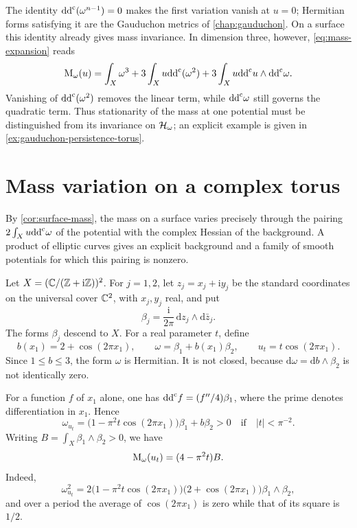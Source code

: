 The identity $\mathrm{dd}^{\mathrm{c}}(\omega^{n-1})=0$ makes the first variation vanish at $u=0$; Hermitian forms satisfying it are the Gauduchon metrics of \cref{chap:gauduchon}. On a surface this identity already gives mass invariance. In dimension three, however, \eqref{eq:mass-expansion} reads
\[
 \mathrm M_\omega(u)=\int_X\omega^3
 +3\int_Xu\mathrm{dd}^{\mathrm{c}}(\omega^2)
 +3\int_Xu\mathrm{dd}^{\mathrm{c}} u\wedge\mathrm{dd}^{\mathrm{c}}\omega.
\]
Vanishing of $\mathrm{dd}^{\mathrm{c}}(\omega^2)$ removes the linear term, while $\mathrm{dd}^{\mathrm{c}}\omega$ still governs the quadratic term. Thus stationarity of the mass at one potential must be distinguished from its invariance on $\mathcal H_\omega$; an explicit example is given in \cref{ex:gauduchon-persistence-torus}.

\section{Mass variation on a complex torus}

By \cref{cor:surface-mass}, the mass on a surface varies precisely through the pairing $2\int_Xu\mathrm{dd}^{\mathrm{c}}\omega$ of the potential with the complex Hessian of the background. A product of elliptic curves gives an explicit background and a family of smooth potentials for which this pairing is nonzero.

\begin{example}\label{ex:torus-mass}
Let $X=(\mathbb C/(\mathbb Z+\mathrm i\mathbb Z))^2$. For $j=1,2$, let $z_j=x_j+\mathrm i y_j$ be the standard coordinates on the universal cover $\mathbb C^2$, with $x_j,y_j$ real, and put
\[
 \beta_j=\frac{\mathrm i}{2\pi}\,\mathrm{d}z_j\wedge \mathrm{d}\bar z_j.
\]
The forms $\beta_j$ descend to $X$. For a real parameter $t$, define
\[
 b(x_1)=2+\cos(2\pi x_1),\qquad
 \omega=\beta_1+b(x_1)\beta_2,\qquad
 u_t=t\cos(2\pi x_1).
\]
Since $1\leq b\leq3$, the form $\omega$ is Hermitian. It is not closed, because $\mathrm{d}\omega=\mathrm{d}b\wedge\beta_2$ is not identically zero.

For a function $f$ of $x_1$ alone, one has $\mathrm{dd}^{\mathrm{c}} f=(f''/4)\beta_1$, where the prime denotes differentiation in $x_1$. Hence
\[
 \omega_{u_t}
 =\bigl(1-\pi^2t\cos(2\pi x_1)\bigr)\beta_1+b\beta_2>0
 \quad\text{if}\quad |t|<\pi^{-2}.
\]
Writing $B=\int_X\beta_1\wedge\beta_2>0$, we have
\begin{equation}\label{eq:torus-mass}
 \mathrm M_\omega(u_t)=(4-\pi^2t)B.
\end{equation}
Indeed,
\[
 \omega_{u_t}^2
 =2\bigl(1-\pi^2t\cos(2\pi x_1)\bigr)
       \bigl(2+\cos(2\pi x_1)\bigr)\beta_1\wedge\beta_2,
\]
and over a period the average of $\cos(2\pi x_1)$ is zero while that of its square is $1/2$.
\end{example}

